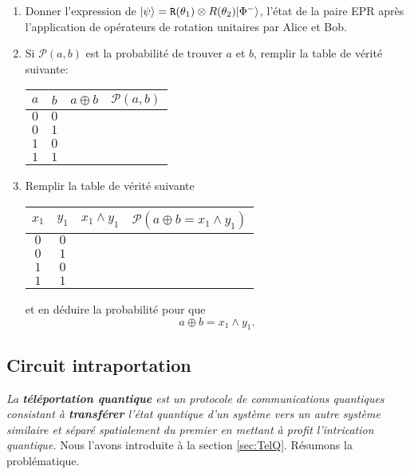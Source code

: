 \begin{enumerate}
\item Donner l'expression de $\vert\psi\rangle=\mathtt{R}(\theta_1)\otimes R(\theta_2)
\vert\Phi^-\rangle$, l'état de la paire EPR après l'application de opérateurs de
rotation unitaires par Alice et Bob.

\item Si $\mathcal{P}(a,b)$ est la probabilité de trouver $a$ et $b$, remplir la
table de vérité suivante:
\begin{center}
\begin{tabular}
[c]{|c|c|c|c|}\hline
\rowcolor[gray]{.8}$a$ & $b$ & $a\oplus b$ & $\mathcal{P}(a,b)$\\\hline
$0$ & $0$ &  & \\\hline
$0$ & $1$ &  & \\\hline
$1$ & $0$ &  & \\\hline
$1$ & $1$ &  & \\\hline
\end{tabular}
\end{center}
\item Remplir la table de vérité suivante
\begin{center}
\begin{tabular}
[c]{|c|c|c|c|}\hline
\rowcolor[gray]{.8}$x_1$ & $y_1$ & $x_1\wedge y_1$ & $\mathcal{P}(a
\oplus b=x_1\wedge y_1)$\\\hline
$0$ & $0$ &  & \\\hline
$0$ & $1$ &  & \\\hline
$1$ & $0$ &  &\\\hline
$1$ & $1$ &  & \\\hline
\end{tabular}
\end{center}
 et en déduire la probabilité pour que%
\begin{equation}
a\oplus b=x_1\wedge y_1.
\end{equation}
\end{enumerate}


\subsection{Circuit intraportation}
\label{sec:CircIntr}

\emph{La \textbf{téléportation quantique} est un protocole de communications
quantiques consistant à \textbf{transférer} l'état quantique d'un système vers
un autre système similaire et séparé spatialement du premier en mettant à profit
l'intrication quantique.} Nous l'avons introduite à la section
\ref{sec:TelQ}. Résumons la problématique.

